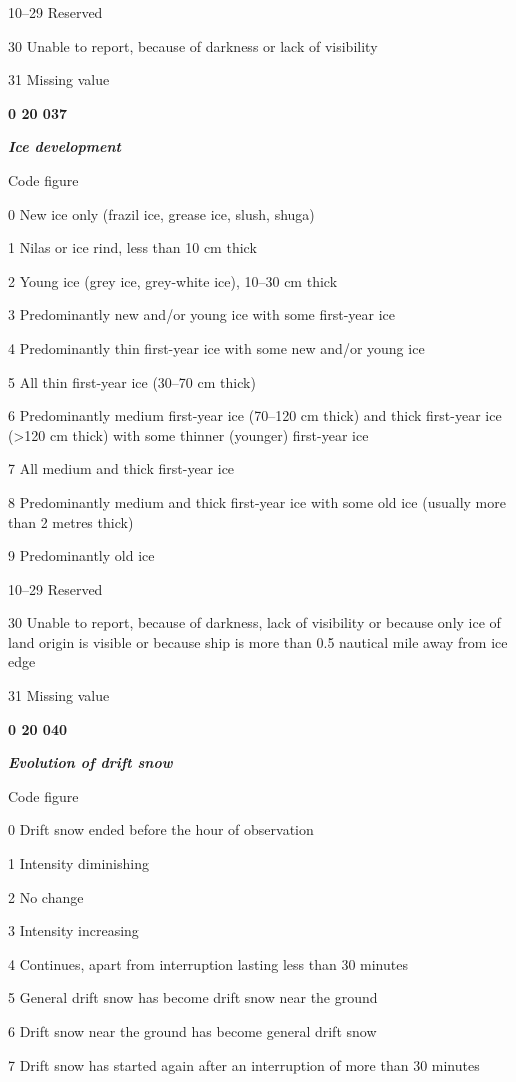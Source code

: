 10--29 Reserved

30 Unable to report, because of darkness or lack of visibility

31 Missing value

\textbf{0 20 037}

\emph{\textbf{Ice development}}

Code figure

0 New ice only (frazil ice, grease ice, slush, shuga)

1 Nilas or ice rind, less than 10 cm thick

2 Young ice (grey ice, grey-white ice), 10--30 cm thick

3 Predominantly new and/or young ice with some first-year ice

4 Predominantly thin first-year ice with some new and/or young ice

5 All thin first-year ice (30--70 cm thick)

6 Predominantly medium first-year ice (70--120 cm thick) and thick first-year ice (\textgreater120 cm thick) with some thinner (younger) first-year ice

7 All medium and thick first-year ice

8 Predominantly medium and thick first-year ice with some old ice (usually more than 2 metres thick)

9 Predominantly old ice

10--29 Reserved

30 Unable to report, because of darkness, lack of visibility or because only ice of land origin is visible or because ship is more than 0.5 nautical mile away from ice edge

31 Missing value

\textbf{0 20 040}

\emph{\textbf{Evolution of drift snow}}

Code figure

0 Drift snow ended before the hour of observation

1 Intensity diminishing

2 No change

3 Intensity increasing

4 Continues, apart from interruption lasting less than 30 minutes

5 General drift snow has become drift snow near the ground

6 Drift snow near the ground has become general drift snow

7 Drift snow has started again after an interruption of more than 30 minutes

